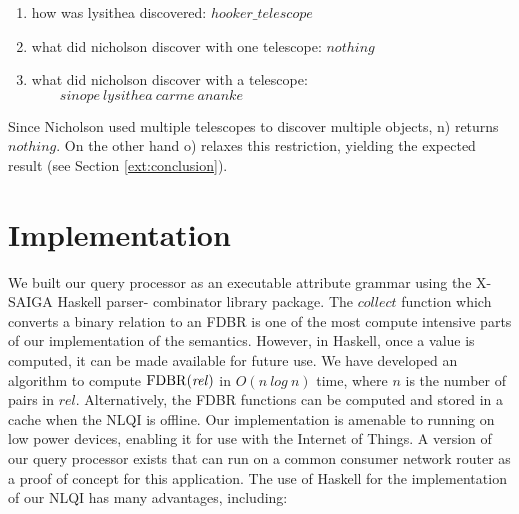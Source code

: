 \documentclass[../main.tex]{subfiles}
\begin{document}
\begin{refsection}
\begin{enumerate}[label=\alph*.]
	\item how was lysithea discovered: $\mathit{hooker\_telescope}$
	\item what did nicholson discover with one telescope: $\mathit{nothing}$
	\item what did nicholson discover with a telescope: \\ $\mathit{\qquad sinope\ lysithea\ carme\ ananke}$
\end{enumerate}
%	
Since Nicholson used multiple telescopes to discover multiple objects, n) returns $\mathit{nothing}$. On the other hand o) relaxes this restriction, yielding the expected result (see Section \ref{ext:conclusion}).

\section{Implementation}
\label{ext:implementation}
We built our query processor as an executable attribute grammar using the X-SAIGA Haskell parser-
combinator library package. %
The $\mathit{collect}$ function which converts a binary relation to an FDBR is one of the most
compute intensive parts of our implementation of the semantics. However, in Haskell, once a value is
computed, it can be made available for future use. We have developed an algorithm to compute
$\mathrm{FDBR}({\mathit{rel}})$ in $O(n\ log\ n)$ time, where $n$ is the number of pairs in $\mathit{rel}$.
Alternatively, the FDBR functions can be computed and stored in a cache when the NLQI is offline.
Our implementation is amenable to running on low power devices, enabling it for use with the Internet of Things. A version of our query processor exists that can run on a common consumer network router as a proof of concept for this application.
The use of Haskell for the implementation of our NLQI has many advantages, including:


\end{refsection}
\end{document}
